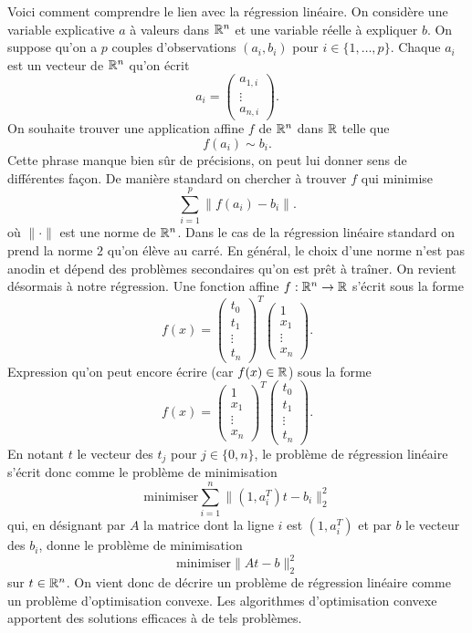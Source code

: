 \documentclass[11pt, a4paper]{article}
\begin{document}
\begin{solution}
  Voici comment comprendre le lien avec la régression linéaire. On
  considère une variable explicative $a$ à valeurs dans $\mathbb{R}^n$ et une
  variable réelle à expliquer $b$. On suppose qu'on a $p$ couples
  d'observations $(a_i, b_i)$ pour $i \in \{1, \ldots,
  p\}$. Chaque $a_i$ est un vecteur de $\mathbb{R}^n$ qu'on écrit 
  \[
  a_i = \begin{pmatrix} a_{1, i} \\ \vdots \\ a_{n, i} \end{pmatrix}.
  \]
  On souhaite trouver une application affine $f$ de $\mathbb{R}^n$ dans $\mathbb{R}$
  telle que
  \[
  f(a_i) \sim b_i.
  \]
  Cette phrase manque bien sûr de précisions, on peut lui donner sens
  de différentes fa\c{c}on. De manière standard on chercher à trouver
  $f$ qui minimise
  \[
  \sum_{i=1}^p \|f(a_i) - b_i\|.
  \]
  où $\|\cdot \|$ est une norme de $\mathbb{R}^n$. Dans le cas de la
  régression linéaire standard on prend la norme $2$ qu'on élève au
  carré. En général, le choix d'une norme n'est pas anodin et dépend
  des problèmes secondaires qu'on est prêt à traîner. On revient
  désormais à notre régression. Une fonction affine $f : \mathbb{R}^n \to \mathbb{R}$
  s'écrit sous la forme
  \[
  f(x) = \begin{pmatrix} t_0 \\ t_1 \\ \vdots \\ t_{n} \end{pmatrix}^T 
  \begin{pmatrix} 1 \\ x_1 \\ \vdots \\ x_n \end{pmatrix}.
  \]
  Expression qu'on peut encore écrire (car $f(x) \in \mathbb{R}$) sous la forme 
  \[
  f(x) = \begin{pmatrix} 1 \\ x_1 \\ \vdots \\ x_n \end{pmatrix}^T
  \begin{pmatrix} t_0 \\ t_1 \\ \vdots \\ t_{n} \end{pmatrix}.
  \]
  En notant $t$ le vecteur des $t_j$ pour $j \in \{0, n\}$, le
  problème de régression linéaire s'écrit donc comme le problème de
  minimisation
  \[
  \textrm{minimiser} \sum_{i=1}^n \|(1, a_i^T)t - b_i \|_2^2
  \]
  qui, en désignant par $A$ la matrice dont la ligne $i$ est
  $(1, a_i^T)$ et par $b$ le vecteur des $b_i$, donne le problème de
  minimisation
  \[
  \textrm{minimiser} \|At - b \|_2^2
  \]
  sur $t \in \mathbb{R}^n$. On vient donc de décrire un problème de régression
  linéaire comme un problème d'optimisation convexe. Les algorithmes
  d'optimisation convexe apportent des solutions efficaces à de tels
  problèmes.
\end{solution}
\end{document}
